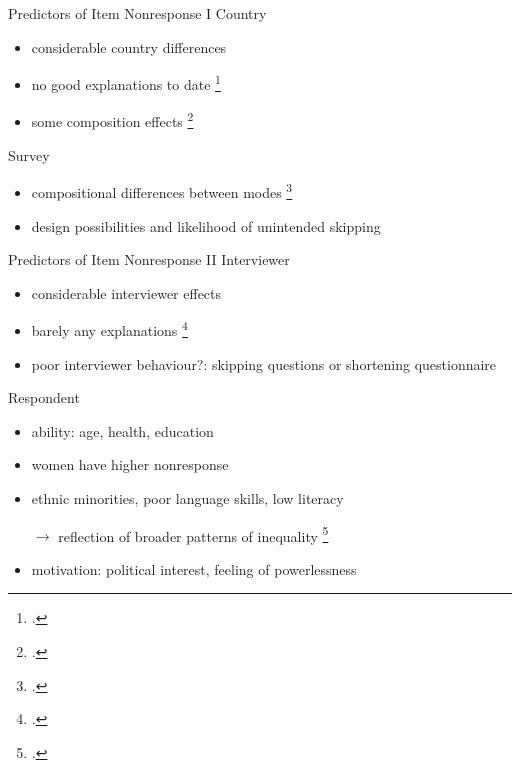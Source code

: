 \documentclass[aspectratio=169]{beamer}
\begin{document}
\begin{frame}{Predictors of Item Nonresponse I}
 Country
 \begin{itemize}
  \item considerable country differences
  \item no good explanations to date \footcite{meitingerPowerCultureItem2020}
  \item some composition effects \footcite{kochItemNonresponseEuropean2009}
 \end{itemize}

  Survey
 \begin{itemize}
  \item compositional differences between modes \footcite{messerDeterminantsItemNonresponse2012}
  \item design possibilities and likelihood of unintended skipping
 \end{itemize}
 \end{frame}
 
 
 \begin{frame}{Predictors of Item Nonresponse II}
  Interviewer
 \begin{itemize}
  \item considerable interviewer effects
  \item barely any explanations \footcite{pickeryImpactRespondentInterviewer1998}
  \item poor interviewer behaviour?: skipping questions or shortening questionnaire
 \end{itemize}

 Respondent
 \begin{itemize}
  \item ability: age, health, education
  \item women have higher nonresponse
  \item ethnic minorities, poor language skills, low literacy
  
  $\rightarrow$ reflection of broader patterns of inequality \footcite{meitingerPowerCultureItem2020}
  \item motivation: political interest, feeling of powerlessness
 \end{itemize}
\end{frame}
\end{document}
